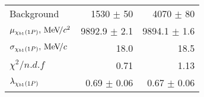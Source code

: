 \begin{table}[H]
{{\begin{tabular}{lrr}
\rule{0pt}{4ex}Background & 1530 $\pm$ 50 & 4070 $\pm$ 80\\

\rule{0pt}{4ex}$\mu_{\chi_{b 1}(1P)}, {\mathrm{\,Me\kern -0.1em V\!/}c^2}$ & 9892.9 $\pm$ 2.1 & 9894.1 $\pm$ 1.6\\
$\sigma_{\chi_{b 1}(1P)}, {\mathrm{\,Me\kern -0.1em V\!/}c}$ & 18.0 & 18.5\\

\rule{0pt}{4ex}$\chi^2 / n.d.f$ & 0.71 & 1.13\\

\rule{0pt}{4ex}$\lambda_{\chi_{b 1}(1P)}$ & 0.69 $\pm$ 0.06 & 0.67 $\pm$ 0.06\\
\bottomrule
\end{tabular}
} %

} %
\label{tab:chib:ups1s:conv_fits}
\end{table}

